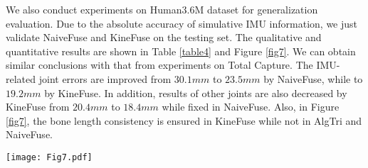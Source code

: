 \documentclass[lettersize,journal]{IEEEtran}
\begin{document}
\begin{table}[!tp]
\caption{Ablation study on the usage of IMUs. Upper represents the upper arms and thighs while lower represents the forearms and calves. 4 and 8 denotes the number of IMUs attached to body bones.}
\begin{center}
\end{center}
\label{table3}
\end{table}

We also conduct experiments on Human3.6M dataset for generalization evaluation. Due to the absolute accuracy of simulative IMU information, we just validate NaiveFuse and KineFuse on the testing set. The qualitative and quantitative results are shown in Table \ref{table4} and Figure \ref{fig7}. We can obtain similar conclusions with that from experiments on Total Capture. The IMU-related joint errors are improved from $30.1mm$
to $23.5mm$ by NaiveFuse, while to $19.2mm$ by KineFuse. In addition, results of other joints are also decreased by KineFuse from $20.4mm$ to $18.4mm$ while fixed in NaiveFuse. Also, in Figure \ref{fig7}, the bone length consistency is ensured in KineFuse while not in AlgTri and NaiveFuse.

\begin{table}[!tp]
\caption{3D pose estimation errors (mm) of the ablation study in Human3.6M dataset. IMU-related joints contain the knees, ankles, elbows and wrists.}
\begin{center}
\end{center}
\label{table4}
\end{table}

\begin{figure*}[!tp]
 \begin{center}
 	\centerline{\texttt{[image: Fig7.pdf]}}
\caption{Illustration of different 3D pose results on Human3.6M dataset. Since there are no real IMU information, AdaDeepFuse is not explored here.}
\label{fig7}
\end{center}
\end{figure*}
\end{document}
